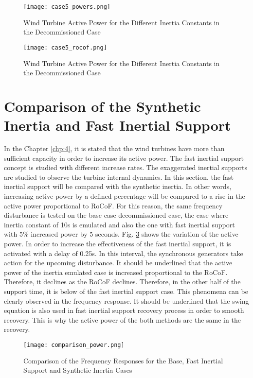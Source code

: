 \begin{figure}[h]
	\centering
	\texttt{[image: case5\_powers.png]}
	\caption{Wind Turbine Active Power for the Different Inertia Constants in the Decommissioned Case}
	\label{Case5_power}
\end{figure}
\begin{figure}[h!]
	\centering
	\texttt{[image: case5\_rocof.png]}
	\caption{Wind Turbine Active Power for the Different Inertia Constants in the Decommissioned Case}
	\label{Case5_rocof}
\end{figure}
\section{Comparison of the Synthetic Inertia and Fast Inertial Support}
In the Chapter \ref{chp:4}, it is stated that the wind turbines have more than sufficient capacity in order to increase its active power. The fast inertial support concept is studied with different increase rates. The exaggerated inertial supports are studied to observe the turbine internal dynamics. In this section, the fast inertial support will be compared with the synthetic inertia. In other words, increasing active power by a defined percentage will be compared to a rise in the active power proportional to RoCoF. For this reason, the same frequency disturbance is tested on the base case decommissioned case, the case where inertia constant of 10s is emulated and also the one with fast inertial support with 5\% increased power by 5 seconds. Fig. \ref{Comp_power} shows the variation of the active power. In order to increase the effectiveness of the fast inertial support, it is activated with a delay of 0.25s. In this interval, the synchronous generators take action for the upcoming disturbance. It should be underlined that the active power of the inertia emulated case is increased proportional to the RoCoF. Therefore, it declines as the RoCoF declines. Therefore, in the other half of the support time, it is below of the fast inertial support case. This phenomena can be clearly observed in the frequency response. It should be underlined that the swing equation is also used in fast inertial support recovery process in order to smooth recovery. This is why the active power of the both methods are the same in the recovery.\par
\begin{figure}[h]
	\centering
	\texttt{[image: comparison\_power.png]}
	\caption{Comparison of the Frequency Responses for the Base, Fast Inertial Support and Synthetic Inertia Cases}
	\label{Comp_power}
\end{figure}
